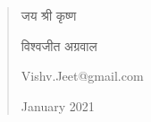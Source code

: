 \begin{quotation}
जय श्री कृष्ण

विश्वजीत अग्रवाल 

\textrm{Vishv.Jeet@gmail.com}

\textrm{January 2021}
\end{quotation}
